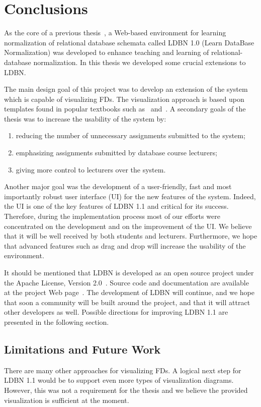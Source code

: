 \chapter{Conclusions}
\label{chap:conclusion}
As the core of a previous thesis~\cite{mt1},
a Web-based environment for learning normalization of relational database schemata
called LDBN 1.0 (Learn DataBase Normalization) was developed to
enhance teaching and learning of relational-database normalization. 
In this thesis we developed some crucial extensions to LDBN.

The main design goal of this project was to develop an extension of the system which is capable of 
visualizing FDs. The visualization approach is based
upon templates found in popular textbooks such as~\cite{bdb1} and~\cite{bdb2}. 
A secondary goals of the
thesis was to increase the usability of the system by: 

\begin{enumerate}
	\item reducing the number of unnecessary assignments
	submitted to the system;
	\item emphasizing assignments submitted by database course lecturers;
	\item giving more control to lecturers over the system.
\end{enumerate}

Another major goal was the
development of a user-friendly, fast and most importantly robust
user interface (UI) for the new features of the system. 
Indeed, the UI is one of the key features of LDBN 1.1 and critical for its
success. Therefore, during the implementation process 
most of our efforts were concentrated on the development and on the improvement of the UI. 
We believe that it will be well received by both students and lecturers.
Furthermore, we hope that advanced features such as drag and drop will 
increase the usability of the environment.

It should be mentioned that LDBN is developed as an open source project 
under the Apache License, Version 2.0~\cite{walv20}. 
Source code and documentation are available at the project Web page~\cite{wldbnpp}. 
The development of LDBN will continue, and we
hope that soon a community will be
built around the project, and that it will attract other developers as well. 
Possible directions for improving LDBN 1.1 are presented in the following section. 

\section{Limitations and Future Work}
There are many other approaches for visualizing FDs.
A logical next step for LDBN 1.1 would be to support
even more types of visualization diagrams. 
However, this was not a requirement for the thesis and we believe the provided 
visualization is sufficient at the moment. 

